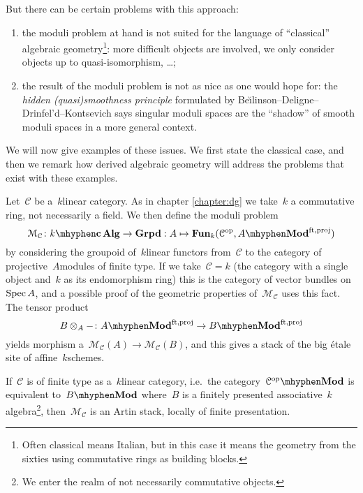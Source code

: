\begin{refsection}
But there can be certain problems with this approach:
\begin{enumerate}
  \item the moduli problem at hand is not suited for the language of ``classical'' algebraic geometry\footnote{Often classical means Italian, but in this case it means the geometry from the sixties using commutative rings as building blocks.}: more difficult objects are involved, we only consider objects up to quasi-isomorphism, \dots;
  \item the result of the moduli problem is not as nice as one would hope for: the \emph{hidden (quasi)smoothness principle} formulated by Be\u\i linson--Deligne--Drinfel'd--Kontsevich says singular moduli spaces are the ``shadow'' of smooth moduli spaces in a more general context.
\end{enumerate}
We will now give examples of these issues. We first state the classical case, and then we remark how derived algebraic geometry will address the problems that exist with these examples.
\begin{example}
  Let~$\mathcal{C}$ be a~$k$\dash linear category. As in chapter \ref{chapter:dg} we take~$k$ a commutative ring, not necessarily a field. We then define the moduli problem
  \begin{equation}
    \mathcal{M}_{\mathcal{C}}\colon k\mhyphen\mathbf{c\,Alg}\to\mathbf{Grpd}:A\mapsto\Fun_k(\mathcal{C}^\opp,A\mhyphen\Mod^{\mathrm{ft,proj}})
  \end{equation}
  by considering the groupoid of~$k$\dash linear functors from~$\mathcal{C}$ to the category of projective~$A$\dash modules of finite type. If we take~$\mathcal{C}=k$ (the category with a single object and~$k$ as its endomorphism ring) this is the category of vector bundles on~$\operatorname{Spec} A$, and a possible proof of the geometric properties of~$\mathcal{M}_{\mathcal{C}}$ uses this fact. The tensor product
  \begin{equation}
    B\otimes_A-\colon A\mhyphen\Mod^{\mathrm{ft,proj}}\to B\mhyphen\Mod^{\mathrm{ft,proj}}
  \end{equation}
  yields morphism a~$\mathcal{M}_{\mathcal{C}}(A)\to\mathcal{M}_{\mathcal{C}}(B)$, and this gives a stack of the big \'etale site of affine~$k$\dash schemes.

  If~$\mathcal{C}$ is of finite type as a~$k$\dash linear category, i.e.\ the category~$\mathcal{C}^\opp\mhyphen\Mod$ is equivalent to~$B\mhyphen\Mod$ where~$B$ is a finitely presented associative~$k$\dash algebra\footnote{We enter the realm of not necessarily commutative objects.}, then~$\mathcal{M}_{\mathcal{C}}$ is an Artin stack, locally of finite presentation.


\end{example}
\end{refsection}
